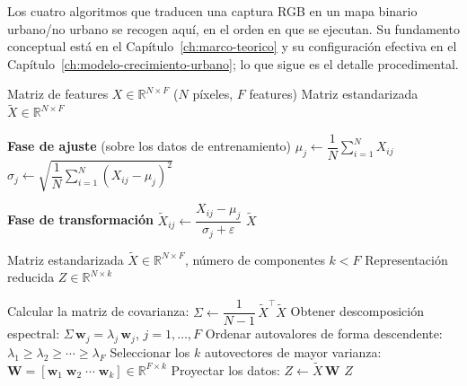 Los cuatro algoritmos que traducen una captura RGB en un mapa binario urbano/no urbano se recogen aquí, en el orden en que se ejecutan. Su fundamento conceptual está en el Capítulo~\ref{ch:marco-teorico} y su configuración efectiva en el Capítulo~\ref{ch:modelo-crecimiento-urbano}; lo que sigue es el detalle procedimental.
\begin{algorithm}[H]
	\caption{StandardScaler: estandarización por z-score}
	\label{alg:standard-scaler}
	\begin{algorithmic}[1]
	\Require Matriz de features $X \in \mathbb{R}^{N \times F}$ ($N$ píxeles, $F$ features)
	\Ensure  Matriz estandarizada $\tilde{X} \in \mathbb{R}^{N \times F}$
	
	\State \textbf{Fase de ajuste} (sobre los datos de entrenamiento)
		\State $\mu_j \leftarrow \dfrac{1}{N}\sum_{i=1}^{N} X_{ij}$
		\State $\sigma_j \leftarrow \sqrt{\dfrac{1}{N}\sum_{i=1}^{N}(X_{ij} - \mu_j)^2}$
	\EndFor
	
	\State \textbf{Fase de transformación}
			\State $\tilde{X}_{ij} \leftarrow \dfrac{X_{ij} - \mu_j}{\sigma_j + \varepsilon}$
		\EndFor
	\EndFor
	\State \Return $\tilde{X}$
	\end{algorithmic}
	\end{algorithm}
\begin{algorithm}[H]
	\caption{PCA: reducción de dimensionalidad}
	\label{alg:pca}
	\begin{algorithmic}[1]
	\Require Matriz estandarizada $\tilde{X} \in \mathbb{R}^{N \times F}$,
			 número de componentes $k < F$
	\Ensure  Representación reducida $Z \in \mathbb{R}^{N \times k}$
	
	\State Calcular la matriz de covarianza:
		   $\Sigma \leftarrow \dfrac{1}{N-1}\,\tilde{X}^\top \tilde{X}$
	\State Obtener descomposición espectral:
		   $\Sigma\,\mathbf{w}_j = \lambda_j\,\mathbf{w}_j$,
		   \quad $j = 1,\ldots,F$
	\State Ordenar autovalores de forma descendente:
		   $\lambda_1 \ge \lambda_2 \ge \cdots \ge \lambda_F$
	\State Seleccionar los $k$ autovectores de mayor varianza:
		   $\mathbf{W} = [\mathbf{w}_1\;\mathbf{w}_2\;\cdots\;\mathbf{w}_k]
		   \in \mathbb{R}^{F \times k}$
	\State Proyectar los datos:
		   $Z \leftarrow \tilde{X}\,\mathbf{W}$
	\State \Return $Z$
	\end{algorithmic}
\end{algorithm}
